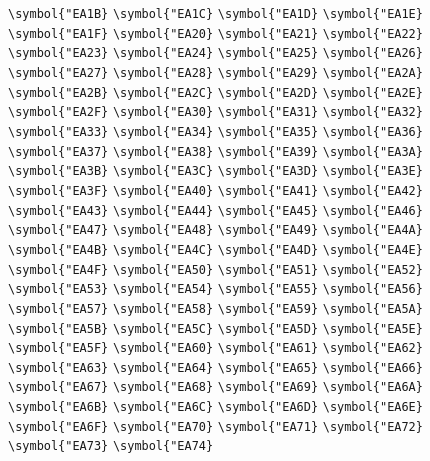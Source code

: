 \documentclass{ctexbook}
\begin{document}
 \verb|\symbol{"EA1B}|  \verb|\symbol{"EA1C}|  \verb|\symbol{"EA1D}|  \verb|\symbol{"EA1E}|  \verb|\symbol{"EA1F}|  \verb|\symbol{"EA20}|  \verb|\symbol{"EA21}|  \verb|\symbol{"EA22}|  \verb|\symbol{"EA23}|  \verb|\symbol{"EA24}|  \verb|\symbol{"EA25}|  \verb|\symbol{"EA26}|  \verb|\symbol{"EA27}|  \verb|\symbol{"EA28}|  \verb|\symbol{"EA29}|  \verb|\symbol{"EA2A}|  \verb|\symbol{"EA2B}|  \verb|\symbol{"EA2C}|  \verb|\symbol{"EA2D}|  \verb|\symbol{"EA2E}|  \verb|\symbol{"EA2F}|  \verb|\symbol{"EA30}|  \verb|\symbol{"EA31}|  \verb|\symbol{"EA32}|  \verb|\symbol{"EA33}|  \verb|\symbol{"EA34}|  \verb|\symbol{"EA35}|  \verb|\symbol{"EA36}|  \verb|\symbol{"EA37}|  \verb|\symbol{"EA38}|  \verb|\symbol{"EA39}|  \verb|\symbol{"EA3A}|  \verb|\symbol{"EA3B}|  \verb|\symbol{"EA3C}|  \verb|\symbol{"EA3D}|  \verb|\symbol{"EA3E}|  \verb|\symbol{"EA3F}|  \verb|\symbol{"EA40}|  \verb|\symbol{"EA41}|  \verb|\symbol{"EA42}|  \verb|\symbol{"EA43}|  \verb|\symbol{"EA44}|  \verb|\symbol{"EA45}|  \verb|\symbol{"EA46}|  \verb|\symbol{"EA47}|  \verb|\symbol{"EA48}|  \verb|\symbol{"EA49}|  \verb|\symbol{"EA4A}|  \verb|\symbol{"EA4B}|  \verb|\symbol{"EA4C}|  \verb|\symbol{"EA4D}|  \verb|\symbol{"EA4E}|  \verb|\symbol{"EA4F}|  \verb|\symbol{"EA50}|  \verb|\symbol{"EA51}|  \verb|\symbol{"EA52}|  \verb|\symbol{"EA53}|  \verb|\symbol{"EA54}|  \verb|\symbol{"EA55}|  \verb|\symbol{"EA56}|  \verb|\symbol{"EA57}|  \verb|\symbol{"EA58}|  \verb|\symbol{"EA59}|  \verb|\symbol{"EA5A}|  \verb|\symbol{"EA5B}|  \verb|\symbol{"EA5C}|  \verb|\symbol{"EA5D}|  \verb|\symbol{"EA5E}|  \verb|\symbol{"EA5F}|  \verb|\symbol{"EA60}|  \verb|\symbol{"EA61}|  \verb|\symbol{"EA62}|  \verb|\symbol{"EA63}|  \verb|\symbol{"EA64}|  \verb|\symbol{"EA65}|  \verb|\symbol{"EA66}|  \verb|\symbol{"EA67}|  \verb|\symbol{"EA68}|  \verb|\symbol{"EA69}|  \verb|\symbol{"EA6A}|  \verb|\symbol{"EA6B}|  \verb|\symbol{"EA6C}|  \verb|\symbol{"EA6D}|  \verb|\symbol{"EA6E}|  \verb|\symbol{"EA6F}|  \verb|\symbol{"EA70}|  \verb|\symbol{"EA71}|  \verb|\symbol{"EA72}|  \verb|\symbol{"EA73}|  \verb|\symbol{"EA74}| 
\end{document}
